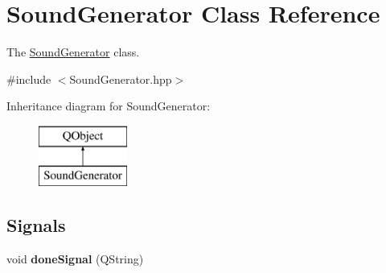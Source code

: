 \hypertarget{classSoundGenerator}{\section{Sound\+Generator Class Reference}
\label{classSoundGenerator}
}


The \hyperlink{classSoundGenerator}{Sound\+Generator} class.  




{\ttfamily \#include $<$Sound\+Generator.\+hpp$>$}

Inheritance diagram for Sound\+Generator\+:\begin{figure}[H]
\begin{center}
\leavevmode
\includegraphics[height=2.000000cm]{classSoundGenerator}
\end{center}
\end{figure}
\subsection*{Signals}
\begin{DoxyCompactItemize}
\item 
\hypertarget{classSoundGenerator_a66f09f54619f0888b925f8181ab3c76a}{void {\bfseries done\+Signal} (Q\+String)}\label{classSoundGenerator_a66f09f54619f0888b925f8181ab3c76a}

\end{DoxyCompactItemize}

